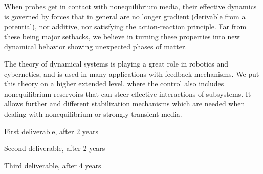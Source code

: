 \begin{workpackage}[id=WPcore,wphases=0-48,
  short=Gen. Theory, %
  title=General Theory, %
  lead=KUL,
  KULRM=36]
\begin{wpdescription}
\end{wpdescription}

\begin{tasklist}

\begin{task}[title=Theory of statistical forces outside equilibrium,id=core-t1,PM=12,lead=KUL,wphases=0-24!0.5]
When probes get in contact with nonequilibrium media, their effective dynamics is governed
by forces that in general are no longer gradient (derivable from a potential), nor additive,
nor satisfying the action-reaction principle. Far from these being major setbacks, we
believe in turning these properties into new dynamical behavior showing unexpected phases of
matter.
\end{task}

\begin{task}[title=Stability and control theory,id=core-t2,PM=12,lead=KUL,wphases=12-36!0.5]
The theory of dynamical systems is playing a great role in robotics and cybernetics, and is
used in many applications with feedback mechanisms. We put this theory on a higher extended
level, where the control also includes nonequilibrium reservoirs that can steer effective
interactions of subsystems.
%
It allows further and different stabilization mechanisms which are needed when dealing with
nonequilibrium or strongly transient media.
\end{task}

\end{tasklist}

\begin{wpdelivs}
  \begin{wpdeliv}[due=24,id=core-d1,dissem=PU,nature=DEM,lead=KUL]
      {First deliverable, after 2 years}
  \end{wpdeliv}
  \begin{wpdeliv}[due=24,id=core-d2,dissem=PU,nature=DEM,lead=KUL]
      {Second deliverable, after 2 years}
\end{wpdeliv}
  \begin{wpdeliv}[due=48,id=core-d3,dissem=PU,nature=DEM,lead=KUL]
      {Third deliverable, after 4 years}
\end{wpdeliv}
\end{wpdelivs}

\end{workpackage}
